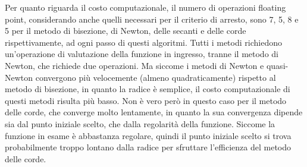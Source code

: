 Per quanto riguarda il costo computazionale, il numero di operazioni floating point, considerando anche quelli necessari per il criterio di arresto, sono 7, 5, 8 e 5 per il metodo di bisezione, di Newton, delle secanti e delle corde rispettivamente, ad ogni passo di questi algoritmi. Tutti i metodi richiedono un'operazione di valutazione della funzione in ingresso, tranne il metodo di Newton, che richiede due operazioni. Ma siccome i metodi di Newton e quasi-Newton convergono più velocemente (almeno quadraticamente) rispetto al metodo di bisezione, in quanto la radice è semplice, il costo computazionale di questi metodi risulta più basso. Non è vero però in questo caso per il metodo delle corde, che converge molto lentamente, in quanto la sua convergenza dipende sia dal punto iniziale scelto, che dalla regolarità della funzione. Siccome la funzione in esame è abbastanza regolare, quindi il punto iniziale scelto si trova probabilmente troppo lontano dalla radice per sfruttare l'efficienza del metodo delle corde.